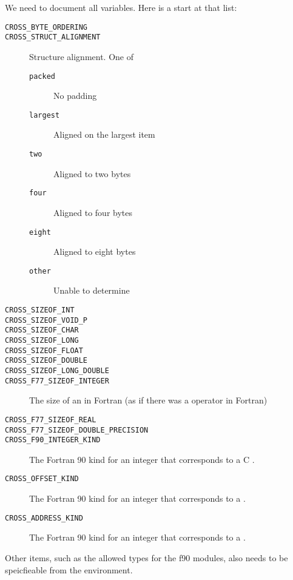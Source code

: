 \documentclass{article}
\begin{document}
We need to document all  variables.  Here is a start at that
list:
\begin{description}
\item[\texttt{CROSS_BYTE_ORDERING}]
\item[\texttt{CROSS_STRUCT_ALIGNMENT}]Structure alignment.  One of 
    \begin{description}
    \item[\texttt{packed}]No padding
    \item[\texttt{largest}]Aligned on the largest item
    \item[\texttt{two}]Aligned to two bytes
    \item[\texttt{four}]Aligned to four bytes
    \item[\texttt{eight}]Aligned to eight bytes
    \item[\texttt{other}]Unable to determine
    \end{description}
\item[\texttt{CROSS_SIZEOF_INT}]
\item[\texttt{CROSS_SIZEOF_VOID_P}]
\item[\texttt{CROSS_SIZEOF_CHAR}]
\item[\texttt{CROSS_SIZEOF_LONG}]
\item[\texttt{CROSS_SIZEOF_FLOAT}]
\item[\texttt{CROSS_SIZEOF_DOUBLE}]
\item[\texttt{CROSS_SIZEOF_LONG_DOUBLE}]
\item[\texttt{CROSS_F77_SIZEOF_INTEGER}]The size of an  in
  Fortran (as if there was a  operator in Fortran)
\item[\texttt{CROSS_F77_SIZEOF_REAL}]
\item[\texttt{CROSS_F77_SIZEOF_DOUBLE_PRECISION}]
\item[\texttt{CROSS_F90_INTEGER_KIND}]The Fortran 90 kind for an integer that
  corresponds to a C .
\item[\texttt{CROSS_OFFSET_KIND}]The Fortran 90 kind for an integer that
  corresponds to a .
\item[\texttt{CROSS_ADDRESS_KIND}]The Fortran 90 kind for an integer that
  corresponds to a .
\end{description}

Other items, such as the allowed types for the f90 modules, also needs
to be speicfieable from the environment.
\end{document}
